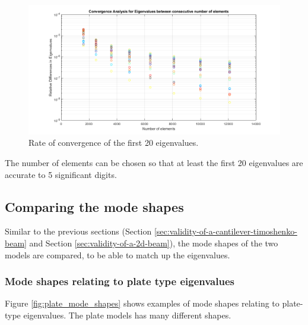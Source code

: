 \documentclass[../../main.tex]{subfiles}
\begin{document}
\begin{figure}[H]
    \centering
    \begin{adjustbox}{center}
        \includegraphics[scale=0.7]{Plate accuracy_no_legend.png}
    \end{adjustbox}
    \caption{Rate of convergence of the first 20 eigenvalues.}
    \label{fig:conv_3d_eig}
\end{figure}

The number of elements can be chosen so that at least the first 20 eigenvalues are accurate to 5 significant digits.

\subsection{Comparing the mode shapes}
Similar to the previous sections (Section \ref{sec:validity-of-a-cantilever-timoshenko-beam} and Section \ref{sec:validity-of-a-2d-beam}), the mode shapes of the two models are compared, to be able to match up the eigenvalues.

\subsubsection{Mode shapes relating to plate type eigenvalues}
Figure \ref{fig:plate_mode_shapes} shows examples of mode shapes relating to plate-type eigenvalues. The plate models has many different shapes.
\end{document}

